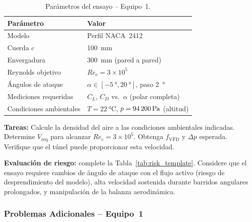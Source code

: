 \documentclass[12pt,a4paper]{article}
\begin{document}
\begin{table}[H]
	\centering
	\caption{Parámetros del ensayo -- Equipo~1.}
	\small
	\begin{tabular}{l l}
		\toprule
		\textbf{Parámetro}      & \textbf{Valor}                                                          \\
		\midrule
		Modelo                  & Perfil NACA~2412                                                        \\
		Cuerda $c$              & \SI{100}{\mm}                                                           \\
		Envergadura             & \SI{300}{\mm} (pared a pared)                                           \\
		Reynolds objetivo       & $Re_c = 3 \times 10^5$                                                  \\
		Ángulos de ataque       & $\alpha \in [\SI{-5}{\degree}, \SI{20}{\degree}]$, paso \SI{2}{\degree} \\
		Mediciones requeridas   & $C_L$, $C_D$ vs.\ $\alpha$ (polar completa)                             \\
		\rowcolor{aeroyellow!20}
		Condiciones ambientales & $T = \SI{22}{\degreeCelsius}$,
		$p = \SI{94\,200}{\pascal}$ (altitud)                                                             \\
		\bottomrule
	\end{tabular}
\end{table}

\textbf{Tareas:} Calcule la densidad del aire a las condiciones ambientales
indicadas.  Determine $V_\mathrm{req}$ para alcanzar $Re_c = 3\times10^5$.
Obtenga $f_\mathrm{VFD}$ y $\Delta p$ esperada.  Verifique que el túnel puede
proporcionar esta velocidad.

\textbf{Evaluación de riesgo:} complete la Tabla~\ref{tab:risk_template}.
Considere que el ensayo requiere cambios de ángulo de ataque con el flujo
activo (riesgo de desprendimiento del modelo), alta velocidad sostenida durante
barridos angulares prolongados, y manipulación de la balanza aerodinámica.

\subsubsection*{Problemas Adicionales -- Equipo~1}
\end{document}

